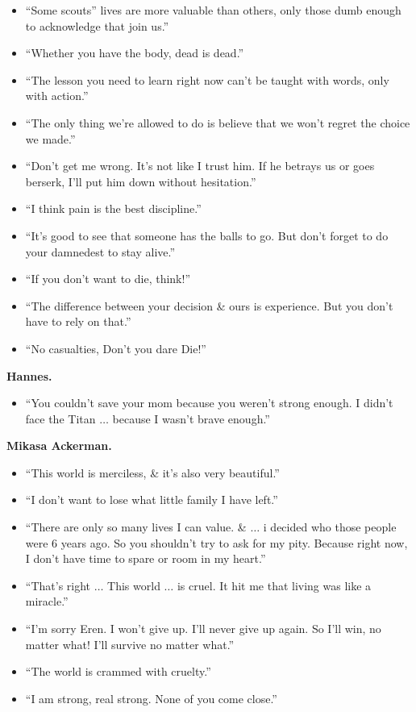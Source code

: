 \documentclass{article}
\begin{document}
\begin{enumerate}
\begin{itemize}
		\item ``Some scouts'' lives are more valuable than others, only those dumb enough to acknowledge that join us.''
		\item ``Whether you have the body, dead is dead.''
		\item ``The lesson you need to learn right now can't be taught with words, only with action.''
		\item ``The only thing we're allowed to do is believe that we won't regret the choice we made.''
		\item ``Don't get me wrong. It's not like I trust him. If he betrays us or goes berserk, I'll put him down without hesitation.''
		\item ``I think pain is the best discipline.''
		\item ``It's good to see that someone has the balls to go. But don't forget to do your damnedest to stay alive.''
		\item ``If you don't want to die, think!''
		\item ``The difference between your decision \& ours is experience. But you don't have to rely on that.''
		\item ``No casualties, Don't you dare Die!''
	\end{itemize}
	{\bf Hannes.}
	\begin{itemize}
		\item ``You couldn't save your mom because you weren't strong enough. I didn't face the Titan $\ldots$ because I wasn't brave enough.''
	\end{itemize}
	{\bf Mikasa Ackerman.}
	\begin{itemize}
		\item ``This world is merciless, \& it's also very beautiful.''
		\item ``I don't want to lose what little family I have left.''
		\item ``There are only so many lives I can value. \& $\ldots$ i decided who those people were 6 years ago. So you shouldn't try to ask for my pity. Because right now, I don't have time to spare or room in my heart.''
		\item ``That's right $\ldots$ This world $\ldots$ is cruel. It hit me that living was like a miracle.''
		\item ``I'm sorry Eren. I won't give up. I'll never give up again. So I'll win, no matter what! I'll survive no matter what.''
		\item ``The world is crammed with cruelty.''
		\item ``I am strong, real strong. None of you come close.''

\end{itemize}
\end{enumerate}
\end{document}

